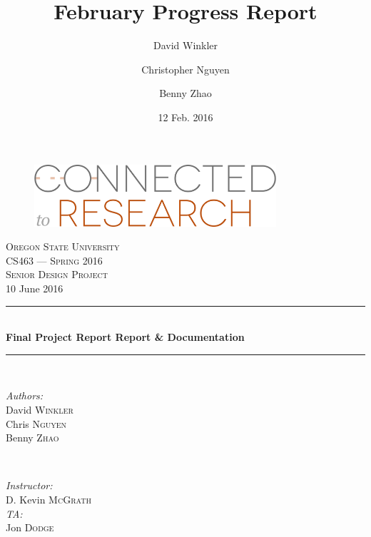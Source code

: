 \documentclass[onecolumn]{IEEEtran}
\title{February Progress Report}
\author{David Winkler \and Christopher Nguyen \and Benny Zhao}
\date{12 Feb. 2016}
\begin{document}
\begin{titlepage}
	\newcommand{\HRule}{\rule{\linewidth}{0.5mm}} %
	\center %
    
    \begin{figure}
        \centering
        \includegraphics[width=0.8\textwidth]{ctr_logo.png}
    \end{figure}
 
	\textsc{\LARGE Oregon State University}\\[1.5cm] %
	\textsc{\Large CS463 --- Spring 2016}\\[0.5cm] %
	\textsc{\large Senior Design Project}\\[0.5cm] %

	{\large 10 June 2016}\\[1cm]
    
	\HRule \\[0.4cm]
		{ \huge \bfseries Final Project Report Report \& Documentation}\\[0.4cm] %
	\HRule \\[1.5cm]

	\begin{minipage}{0.4\textwidth}
		\begin{flushleft} \large
			\emph{Authors:}\\
			David \textsc{Winkler}\\ %
			Chris \textsc{Nguyen}\\
			Benny \textsc{Zhao}
		\end{flushleft}
	\end{minipage}
	~
	\begin{minipage}{0.4\textwidth}
		\begin{flushright} \large
			\emph{Instructor:} \\
			D. Kevin \textsc{McGrath} \\
            \emph{TA:} \\
            Jon \textsc{Dodge}
		\end{flushright}
	\end{minipage}\\[2cm]
    

\end{titlepage}
\end{document}
